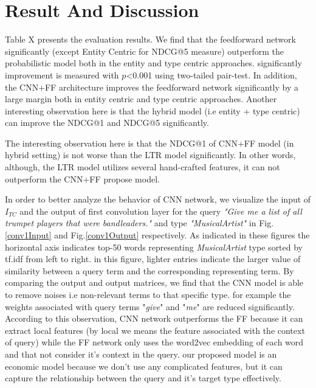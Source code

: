 \section{Result And Discussion}
Table X presents the evaluation results. We find that the feedforward network significantly (except Entity Centric for NDCG@5 measure) outperform the probabilistic model both in the entity and type centric approaches. significantly improvement is measured with $p$<0.001 using two-tailed pair-test. In addition, the CNN+FF architecture improves the feedforward network significantly by a large margin both in entity centric and type centric approaches. Another interesting observation here is that the hybrid model (i.e entity + type centric) can improve the NDCG@1 and NDCG@5 significantly.

The interesting observation here is that the NDCG@1 of CNN+FF model (in hybrid setting) is not worse than the LTR model significantly. In other words, although, the LTR model utilizes several hand-crafted features, it can not outperform the CNN+FF propose model.

In order to better analyze the behavior of CNN network, we visualize the input of $I_{TC}$ and the output of first convolution layer for the query \textit{"Give me a list of all trumpet players that were bandleaders."} and type \textit{"MusicalArtist"} in Fig.\ref{conv1Input} and Fig.\ref{conv1Output} respectively. As indicated in these figures the horizontal axis indicates top-50 words representing \textit{MusicalArtist} type sorted by tf.idf from left to right. in this figure, lighter entries indicate the larger value of similarity between a query term and the corresponding representing term. By comparing the output and output matrices, we find that the CNN model is able to remove noises i.e non-relevant terms to that specific type. for example the weights associated with query terms "\textit{give}" and "\textit{me}" are reduced significantly. According to this observation, CNN network outperforms the FF because it can extract local features (by local we means the feature associated with the context of query) while the FF network only uses the word2vec embedding of each word and that not consider it's context in the query. our proposed model is an economic model because we don't use any complicated features, but it can capture the relationship between the query and it's target type effectively.     




